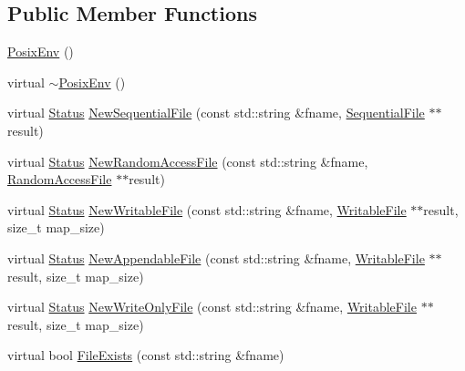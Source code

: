 \subsection*{Public Member Functions}
\begin{DoxyCompactItemize}
\item 
\hyperlink{classleveldb_1_1anonymous__namespace_02env__posix_8cc_03_1_1_posix_env_a2f71090e958f1cdc54f0ce77e05326c0}{Posix\+Env} ()
\item 
virtual \hyperlink{classleveldb_1_1anonymous__namespace_02env__posix_8cc_03_1_1_posix_env_ab1b0d571fe5aefcae1a1a0fc2a6b2a29}{$\sim$\+Posix\+Env} ()
\item 
virtual \hyperlink{classleveldb_1_1_status}{Status} \hyperlink{classleveldb_1_1anonymous__namespace_02env__posix_8cc_03_1_1_posix_env_a0b81c86cd47fa8b91f9171833d6610e1}{New\+Sequential\+File} (const std\+::string \&fname, \hyperlink{classleveldb_1_1_sequential_file}{Sequential\+File} $\ast$$\ast$result)
\item 
virtual \hyperlink{classleveldb_1_1_status}{Status} \hyperlink{classleveldb_1_1anonymous__namespace_02env__posix_8cc_03_1_1_posix_env_ad056dfc415f95dcda99d022412954437}{New\+Random\+Access\+File} (const std\+::string \&fname, \hyperlink{classleveldb_1_1_random_access_file}{Random\+Access\+File} $\ast$$\ast$result)
\item 
virtual \hyperlink{classleveldb_1_1_status}{Status} \hyperlink{classleveldb_1_1anonymous__namespace_02env__posix_8cc_03_1_1_posix_env_aaffa3c917c8ea66a09a3518ec8480c0f}{New\+Writable\+File} (const std\+::string \&fname, \hyperlink{classleveldb_1_1_writable_file}{Writable\+File} $\ast$$\ast$result, size\+\_\+t map\+\_\+size)
\item 
virtual \hyperlink{classleveldb_1_1_status}{Status} \hyperlink{classleveldb_1_1anonymous__namespace_02env__posix_8cc_03_1_1_posix_env_a6021b08acd9d80543fa40b5e659f766d}{New\+Appendable\+File} (const std\+::string \&fname, \hyperlink{classleveldb_1_1_writable_file}{Writable\+File} $\ast$$\ast$result, size\+\_\+t map\+\_\+size)
\item 
virtual \hyperlink{classleveldb_1_1_status}{Status} \hyperlink{classleveldb_1_1anonymous__namespace_02env__posix_8cc_03_1_1_posix_env_addf1baff0cca8c772d4866e89f448a33}{New\+Write\+Only\+File} (const std\+::string \&fname, \hyperlink{classleveldb_1_1_writable_file}{Writable\+File} $\ast$$\ast$result, size\+\_\+t map\+\_\+size)
\item 
virtual bool \hyperlink{classleveldb_1_1anonymous__namespace_02env__posix_8cc_03_1_1_posix_env_a3470ccaa29a6ddabb42e07c0f6aac27e}{File\+Exists} (const std\+::string \&fname)
$$
\end{DoxyCompactItemize}
